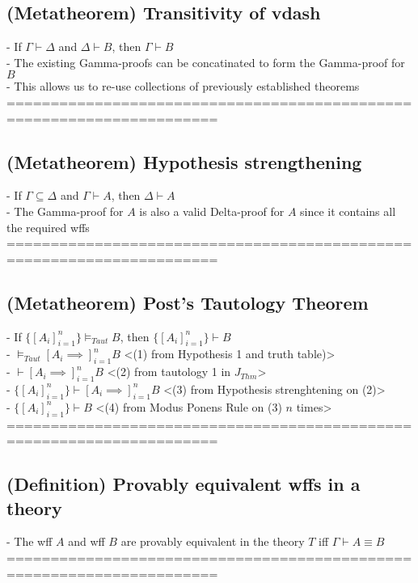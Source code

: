 \documentclass{article}
\begin{document}
\subsection{(Metatheorem) Transitivity of vdash}
	- If $\Gamma \vdash \Delta$ and $\Delta \vdash B$, then $\Gamma \vdash B$ \\
	- The existing Gamma-proofs can be concatinated to form the Gamma-proof for $B$ \\
	- This allows us to re-use collections of previously established theorems
	======================================================================
\subsection{(Metatheorem) Hypothesis strengthening}
	- If $\Gamma \subseteq \Delta$ and $\Gamma \vdash A$, then $\Delta \vdash A$ \\
	- The Gamma-proof for $A$ is also a valid Delta-proof for $A$ since it contains all the required wffs \\
	======================================================================
\subsection{(Metatheorem) Post's Tautology Theorem}
	- If $\{[A_i]_{i=1}^n\} \vDash_{Taut} B$, then $\{[A_i]_{i=1}^n\} \vdash B$ \\
	- $\vDash_{Taut} [A_i \implies]_{i=1}^n B$ <(1) from Hypothesis 1 and truth table)> \\
	- $\vdash [A_i \implies]_{i=1}^n B$ <(2) from tautology 1 in $J_{Thm}$> \\
	- $\{[A_i]_{i=1}^n\} \vdash [A_i \implies]_{i=1}^n B$ <(3) from Hypothesis strenghtening on (2)>\\
	- $\{[A_i]_{i=1}^n\} \vdash B$ <(4) from Modus Ponens Rule on (3) $n$ times>
	======================================================================
\subsection{(Definition) Provably equivalent wffs in a theory}
	- The wff $A$ and wff $B$ are provably equivalent in the theory $T$ iff $\Gamma \vdash A \equiv B$
	======================================================================
\end{document}
